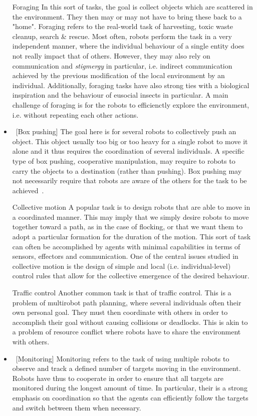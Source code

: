     \begin{itemize}
      \item [Foraging] {In this sort of tasks, the goal is collect objects which are scattered in the environment. They then may or may not have to bring these back to a "home". Foraging refers to the real-world task of harvesting, toxic waste cleanup, search \& rescue. Most often, robots perform the task in a very independent manner, where the individual behaviour of a single entity does not really impact that of others. However, they may also rely on communication and \emph{stigmergy} in particular, i.e. indirect communication achieved by the previous modification of the local environment by an individual. Additionally, foraging tasks have also strong ties with a biological inspiration and the behaviour of eusocial insects in particular. A main challenge of foraging is for the robots to efficienctly explore the environment, i.e. without repeating each other actions.}

      \item [Box pushing] {The goal here is for several robots to collectively push an object. This object usually too big or too heavy for a single robot to move it alone and it thus requires the coordination of several individuals. A specific type of box pushing, cooperative manipulation, may require to robots to carry the objects to a destination (rather than pushing). Box pushing may not necessarily require that robots are aware of the others for the task to be achieved~\parencite{Sen1994}. }

      \item [Collective motion] {A popular task is to design robots that are able to move in a coordinated manner. This may imply that we simply desire robots to move together toward a path, as in the case of flocking, or that we want them to adopt a particular formation for the duration of the motion. This sort of task can often be accomplished by agents with minimal capabilities in terms of sensors, effectors and communication. One of the central issues studied in collective motion is the design of simple and local (i.e. individual-level) control rules that allow for the collective emergence of the desired behaviour.}

      \item [Traffic control] {Another common task is that of traffic control. This is a problem of multirobot path planning, where several individuals often their own personal goal. They must then coordinate with others in order to accomplish their goal without causing collisions or deadlocks. This is akin to a problem of resource conflict where robots have to share the environment with others.}

      \item [Monitoring] {Monitoring refers to the task of using multiple robots to observe and track a defined number of targets moving in the environment. Robots have thus to cooperate in order to ensure that all targets are monitored during the longest amount of time. In particular, their is a strong emphasis on coordination so that the agents can efficiently follow the targets and switch between them when necessary.}
    \end{itemize}

